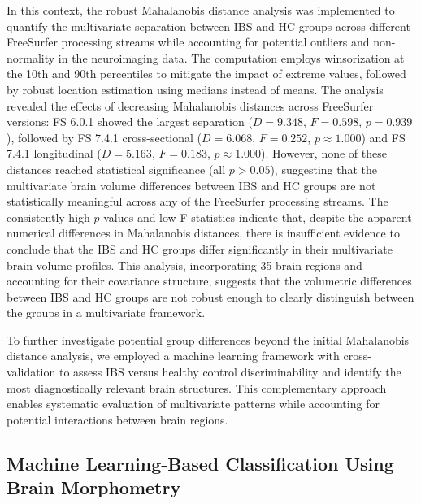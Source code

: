 \documentclass[diagnostics,article,accept,pdftex,moreauthors]{Definitions/mdpi}
\begin{document}
In this context, the robust Mahalanobis distance analysis was implemented to quantify the multivariate separation between IBS and HC groups across different FreeSurfer processing streams while accounting for potential outliers and non-normality in the neuroimaging data. The computation employs winsorization at the 10th and 90th percentiles to mitigate the impact of extreme values, followed by robust location estimation using medians instead of means. The analysis revealed the effects of decreasing Mahalanobis distances across FreeSurfer versions: FS 6.0.1 showed the largest separation ($D = 9.348$, $F = 0.598$, $p = 0.939$), followed by FS 7.4.1 cross-sectional ($D = 6.068$, $F = 0.252$, $p \approx 1.000$) and FS 7.4.1 longitudinal ($D = 5.163$, $F = 0.183$, $p \approx 1.000$). However, none of these distances reached statistical significance (all $p > 0.05$), suggesting that the multivariate brain volume differences between IBS and HC groups are not statistically meaningful across any of the FreeSurfer processing streams. The consistently high $p$-values and low F-statistics indicate that, despite the apparent numerical differences in Mahalanobis distances, there is insufficient evidence to conclude that the IBS and HC groups differ significantly in their multivariate brain volume profiles. This analysis, incorporating 35 brain regions and accounting for their covariance structure, suggests that the volumetric differences between IBS and HC groups are not robust enough to clearly distinguish between the groups in a multivariate framework.

To further investigate potential group differences beyond the initial Mahalanobis distance analysis, we employed a machine learning framework with cross-validation to assess IBS versus healthy control discriminability and identify the most diagnostically relevant brain structures. This complementary approach enables systematic evaluation of multivariate patterns while accounting for potential interactions between brain regions.


\subsection{Machine Learning-Based Classification Using Brain Morphometry}
\end{document}
